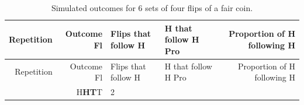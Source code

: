 \documentclass[
]{book}
\theoremstyle{definition}
\theoremstyle{definition}
\theoremstyle{definition}
\theoremstyle{remark}
\begin{document}
\begin{longtable}[]{@{}rrllr@{}}
\caption{\label{tab:mscoin-intro} Simulated outcomes for 6 sets of four flips of a fair coin.}\tabularnewline
\toprule
\begin{minipage}[b]{0.12\columnwidth}\raggedleft
Repetition \textbar{}\strut
\end{minipage} & \begin{minipage}[b]{0.10\columnwidth}\raggedleft
Outcome \textbar{} Fl\strut
\end{minipage} & \begin{minipage}[b]{0.20\columnwidth}\raggedright
Flips that follow H \textbar{}\strut
\end{minipage} & \begin{minipage}[b]{0.16\columnwidth}\raggedright
H that follow H \textbar{} Pro\strut
\end{minipage} & \begin{minipage}[b]{0.28\columnwidth}\raggedleft
Proportion of H following H \textbar{}\strut
\end{minipage}\tabularnewline
\midrule
\endfirsthead
\toprule
\begin{minipage}[b]{0.12\columnwidth}\raggedleft
Repetition \textbar{}\strut
\end{minipage} & \begin{minipage}[b]{0.10\columnwidth}\raggedleft
Outcome \textbar{} Fl\strut
\end{minipage} & \begin{minipage}[b]{0.20\columnwidth}\raggedright
Flips that follow H \textbar{}\strut
\end{minipage} & \begin{minipage}[b]{0.16\columnwidth}\raggedright
H that follow H \textbar{} Pro\strut
\end{minipage} & \begin{minipage}[b]{0.28\columnwidth}\raggedleft
Proportion of H following H \textbar{}\strut
\end{minipage}\tabularnewline
\midrule
\endhead
\begin{minipage}[t]{0.12\columnwidth}\raggedleft
1 \textbar{}\strut
\end{minipage} & \begin{minipage}[t]{0.10\columnwidth}\raggedleft
H\textbf{HT}T \textbar{}\strut
\end{minipage} & \begin{minipage}[t]{0.20\columnwidth}\raggedright
2 \textbar{}\strut
\end{minipage} & \begin{minipage}[t]{0.16\columnwidth}\raggedright

\end{minipage}
\end{longtable}
\end{document}
